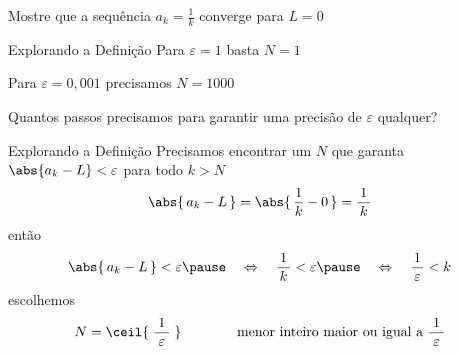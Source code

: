 \begin{question}
  Mostre que a sequência \(a_k = \frac{1}{k}\) converge para $L = 0$
\end{question}

\begin{resolution}{Explorando a Definição}
  Para $\varepsilon=1$     \tabto{28mm} basta      \tabto{50mm} $N=1$

  \pause
  Para $\varepsilon=0,001$ \tabto{28mm} precisamos \tabto{50mm} $N=1000$

  \pause
  \vspace{\baselineskip}
  Quantos passos precisamos para garantir uma precisão de $\varepsilon$ qualquer?
\end{resolution}

\begin{resolution}{Explorando a Definição}
  Precisamos encontrar um $N$ que garanta
  \(\abs{a_k-L}<\varepsilon\)
  para todo $k>N$
  \pause
  \[\abs{\,a_k-L\,} = \abs{\,\frac{1}{k}-0\,} = \frac{1}{\,k\,} \]
  \pause
  então
  \[
    \abs{\,a_k-L\,}<\varepsilon
    \pause
    \quad\Leftrightarrow\quad
    \frac{1}{\,k\,} < \varepsilon
    \pause
    \quad\Leftrightarrow\quad
    \frac{1}{\,\varepsilon\,} < k
  \]
  \pause
  escolhemos
  \[
    N = \ceil{\;\frac{1}{\;\varepsilon\;}\;}
    \qquad\qquad\text{menor inteiro maior ou igual a } \frac{1}{\;\varepsilon\;}
  \]
\end{resolution}

